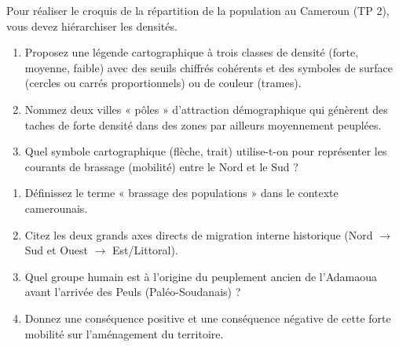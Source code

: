 \documentclass[11pt]{article}
\begin{document}
\begin{exercice}
Pour réaliser le croquis de la répartition de la population au Cameroun (TP 2), vous devez hiérarchiser les densités.
\begin{enumerate}
    \item Proposez une légende cartographique à trois classes de densité (forte, moyenne, faible) avec des seuils chiffrés cohérents et des symboles de surface (cercles ou carrés proportionnels) ou de couleur (trames).
    \item Nommez deux villes « pôles » d'attraction démographique qui génèrent des taches de forte densité dans des zones par ailleurs moyennement peuplées.
    \item Quel symbole cartographique (flèche, trait) utilise-t-on pour représenter les courants de brassage (mobilité) entre le Nord et le Sud ?
\end{enumerate}
\end{exercice}

\begin{exercice}
\begin{enumerate}
    \item Définissez le terme « brassage des populations » dans le contexte camerounais.
    \item Citez les deux grands axes directs de migration interne historique (Nord $\rightarrow$ Sud et Ouest $\rightarrow$ Est/Littoral).
    \item Quel groupe humain est à l'origine du peuplement ancien de l'Adamaoua avant l'arrivée des Peuls (Paléo-Soudanais) ?
    \item Donnez une conséquence positive et une conséquence négative de cette forte mobilité sur l'aménagement du territoire.
\end{enumerate}
\end{exercice}
\end{document}
